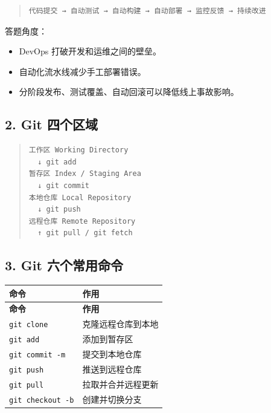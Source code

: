 \documentclass[UTF8,zihao=-4]{ctexart}
\begin{document}
\begin{quote}
\footnotesize
\begin{verbatim}
代码提交 → 自动测试 → 自动构建 → 自动部署 → 监控反馈 → 持续改进
\end{verbatim}
\end{quote}

答题角度：

\begin{itemize}
\item DevOps 打破开发和运维之间的壁垒。
\item 自动化流水线减少手工部署错误。
\item 分阶段发布、测试覆盖、自动回滚可以降低线上事故影响。
\end{itemize}

\subsection{2. Git 四个区域}

\begin{quote}
\footnotesize
\begin{verbatim}
工作区 Working Directory
  ↓ git add
暂存区 Index / Staging Area
  ↓ git commit
本地仓库 Local Repository
  ↓ git push
远程仓库 Remote Repository
  ↑ git pull / git fetch
\end{verbatim}
\end{quote}

\subsection{3. Git 六个常用命令}

{
\footnotesize
\begin{longtable}{|>{\raggedright\arraybackslash}p{}|>{\raggedright\arraybackslash}p{}|}
\hline
\textbf{命令} & \textbf{作用} \\
\hline
\endfirsthead
\hline
\textbf{命令} & \textbf{作用} \\
\hline
\endhead
\texttt{git clone} & 克隆远程仓库到本地 \\
\hline
\texttt{git add} & 添加到暂存区 \\
\hline
\texttt{git commit -m} & 提交到本地仓库 \\
\hline
\texttt{git push} & 推送到远程仓库 \\
\hline
\texttt{git pull} & 拉取并合并远程更新 \\
\hline
\texttt{git checkout -b} & 创建并切换分支 \\
\hline
\end{longtable}
}
\end{document}
